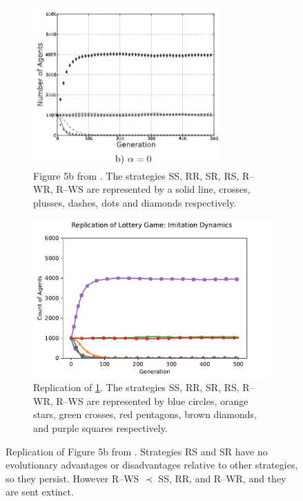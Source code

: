\begin{figure}[!h]
  \begin{subfigure}[b]{0.45\textwidth}
    \includegraphics[width=\textwidth]{images/lottery2.png}
    \caption{Figure 5b from \cite{RN30}. The strategies SS, RR, SR, RS, R--WR, R--WS are represented by a solid line, crosses, plusses, dashes, dots and diamonds respectively. }
    \label{lottery2}
  \end{subfigure}
  \hfill
  \begin{subfigure}[b]{0.45\textwidth}
    \includegraphics[width=1.25\textwidth]{images/lottery2_me.pdf}
    \caption{Replication of \ref{lottery2}. The strategies SS, RR, SR, RS, R--WR, R--WS are represented by blue circles, orange stars, green crosses, red pentagons, brown diamonds, and purple squares respectively.}
    \label{lottery2_me}
  \end{subfigure}
  \caption{Replication of Figure 5b from \cite{RN30}. Strategies RS and SR have no evolutionary advantages or disadvantages relative to other strategies, so they persist. However R--WS $\prec$ SS, RR, and R--WR, and they are sent extinct.} \label{lottery_comp1}
\end{figure} 
\FloatBarrier



